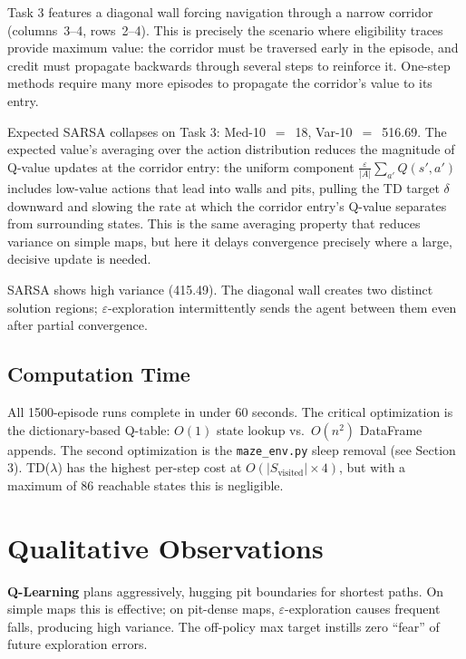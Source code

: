 \documentclass[11pt,letterpaper]{article}
\begin{document}
Task 3 features a diagonal wall forcing navigation through a narrow corridor
(columns~3--4, rows~2--4). This is precisely the scenario where eligibility traces
provide maximum value: the corridor must be traversed early in the episode, and
credit must propagate backwards through several steps to reinforce it. One-step
methods require many more episodes to propagate the corridor's value to its entry.

Expected SARSA collapses on Task 3: Med-10~$=$~18, Var-10~$=$~516.69. The expected
value's averaging over the action distribution reduces the magnitude of Q-value
updates at the corridor entry: the uniform component
$\frac{\varepsilon}{|A|}\sum_{a'}Q(s',a')$ includes low-value actions that lead
into walls and pits, pulling the TD target $\delta$ downward and slowing the rate
at which the corridor entry's Q-value separates from surrounding states.
This is the same averaging property that reduces variance on simple maps,
but here it delays convergence precisely where a large, decisive update is needed.

SARSA shows high variance (415.49). The diagonal wall creates two distinct solution
regions; $\varepsilon$-exploration intermittently sends the agent between them even
after partial convergence.

\subsection{Computation Time}

All 1500-episode runs complete in under 60 seconds. The critical optimization
is the dictionary-based Q-table: $O(1)$ state lookup vs.\ $O(n^2)$ DataFrame
appends. The second optimization is the \texttt{maze\_env.py} sleep removal
(see Section 3). TD($\lambda$) has the highest per-step cost at
$O(|S_{\text{visited}}| \times 4)$, but with a maximum of 86 reachable states
this is negligible.

\section{Qualitative Observations}

\textbf{Q-Learning} plans aggressively, hugging pit boundaries for shortest paths.
On simple maps this is effective; on pit-dense maps, $\varepsilon$-exploration
causes frequent falls, producing high variance. The off-policy max target instills
zero ``fear'' of future exploration errors.
\end{document}
